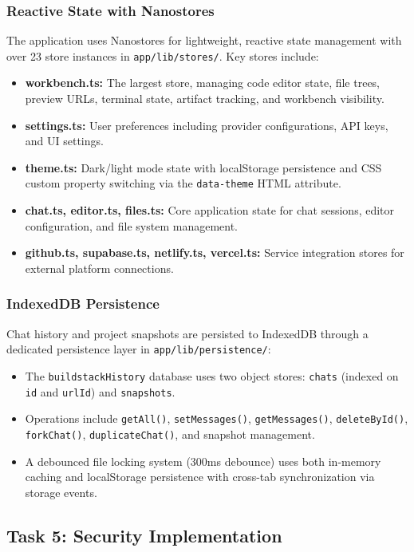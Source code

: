 \documentclass[12pt,a4paper,openany]{report}
\begin{document}
\subsubsection{Reactive State with Nanostores}
The application uses Nanostores for lightweight, reactive state management with over 23 store instances in \texttt{app/lib/stores/}. Key stores include:
\begin{itemize}
    \item \textbf{workbench.ts:} The largest store, managing code editor state, file trees, preview URLs, terminal state, artifact tracking, and workbench visibility.
    \item \textbf{settings.ts:} User preferences including provider configurations, API keys, and UI settings.
    \item \textbf{theme.ts:} Dark/light mode state with localStorage persistence and CSS custom property switching via the \texttt{data-theme} HTML attribute.
    \item \textbf{chat.ts, editor.ts, files.ts:} Core application state for chat sessions, editor configuration, and file system management.
    \item \textbf{github.ts, supabase.ts, netlify.ts, vercel.ts:} Service integration stores for external platform connections.
\end{itemize}

\subsubsection{IndexedDB Persistence}
Chat history and project snapshots are persisted to IndexedDB through a dedicated persistence layer in \texttt{app/lib/persistence/}:
\begin{itemize}
    \item The \texttt{buildstackHistory} database uses two object stores: \texttt{chats} (indexed on \texttt{id} and \texttt{urlId}) and \texttt{snapshots}.
    \item Operations include \texttt{getAll()}, \texttt{setMessages()}, \texttt{getMessages()}, \texttt{deleteById()}, \texttt{forkChat()}, \texttt{duplicateChat()}, and snapshot management.
    \item A debounced file locking system (300ms debounce) uses both in-memory caching and localStorage persistence with cross-tab synchronization via storage events.
\end{itemize}

\subsection{Task 5: Security Implementation}
\end{document}

